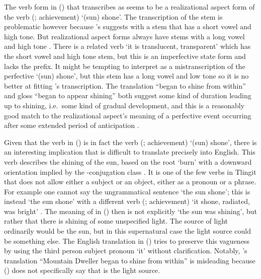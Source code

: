 The verb form in (\lastx) that \citeauthor{swanton:1909} transcribes as  seems to be a realizational aspect form of the verb  (; achievement) ‘(sun) shone’.
The transcription of the stem is problematic however because \citeauthor{swanton:1909}’s  suggests  with a  stem that has a short vowel and high tone.
But realizational aspect forms always have  stems with a long vowel and high tone \parencites[208]{leer:1991}[150, 569]{crippen:2019}.
There is a related verb  ‘it is translucent, transparent’ \parencite[646]{leer:1976} which has the short vowel and high tone stem, but this is an imperfective state form and lacks the  prefix.
It might be tempting to interpret  as a mistranscription of the perfective  ‘(sun) shone’, but this stem has a long vowel and low tone so it is no better at fitting \citeauthor{swanton:1909}’s transcription.
The translation “began to shine from within” and gloss “began to appear shining” both suggest some kind of duration leading up to shining, i.e.\ some kind of gradual development, and this is a reasonably good match to the realizational aspect’s meaning of a perfective event occurring after some extended period of anticipation \parencites[378–379]{leer:1991}[568–572]{crippen:2019}.

Given that the verb in (\lastx) is in fact the verb  (; achievement) ‘(sun) shone’, there is an interesting implication that is difficult to translate precisely into English.
This verb describes the shining of the sun, based on the root  ‘burn’ with a downward orientation implied by the -conjugation class \parencite[592, 622]{crippen:2019}.
It is one of the few verbs in Tlingit that does not allow either a subject or an object, either as a pronoun or a phrase.
For example one cannot say the ungrammatical sentence  ‘the sun shone’; this is instead  ‘the sun shone’ with a different verb  (; achievement) ‘it shone, radiated, was bright’ \parencite[646]{leer:1976}.
The meaning of  in (\lastx) then is not explicitly ‘the sun was shining’, but rather that there is shining of some unspecified light.
The source of light ordinarily would be the sun, but in this supernatural case the light source could be something else.
The English translation in (\lastx) tries to preserve this vagueness by using the third person subject pronoun ‘it’ without clarification.
Notably, \citeauthor{swanton:1909}’s translation “Mountain Dweller began to shine from within” is misleading because (\lastx) does not specifically say that  is the light source.


